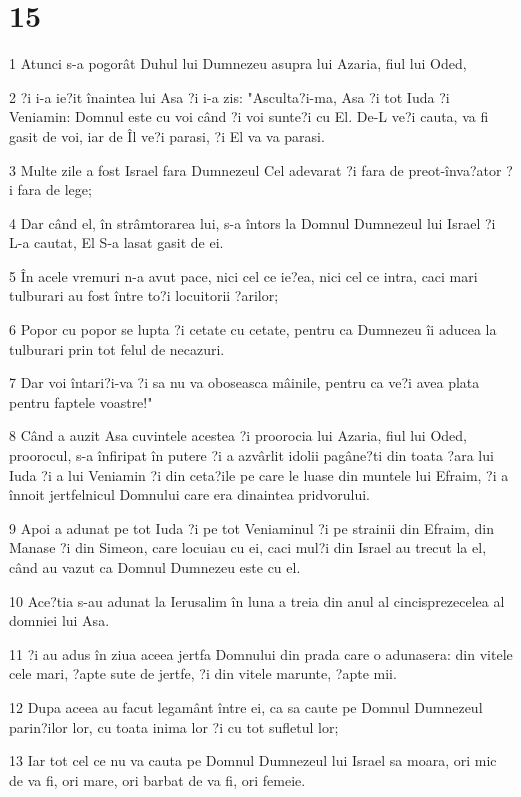 \chapter{15}

\par 1 Atunci s-a pogorât Duhul lui Dumnezeu asupra lui Azaria, fiul lui Oded,
\par 2 ?i i-a ie?it înaintea lui Asa ?i i-a zis: "Asculta?i-ma, Asa ?i tot Iuda ?i Veniamin: Domnul este cu voi când ?i voi sunte?i cu El. De-L ve?i cauta, va fi gasit de voi, iar de Îl ve?i parasi, ?i El va va parasi.
\par 3 Multe zile a fost Israel fara Dumnezeul Cel adevarat ?i fara de preot-înva?ator ?i fara de lege;
\par 4 Dar când el, în strâmtorarea lui, s-a întors la Domnul Dumnezeul lui Israel ?i L-a cautat, El S-a lasat gasit de ei.
\par 5 În acele vremuri n-a avut pace, nici cel ce ie?ea, nici cel ce intra, caci mari tulburari au fost între to?i locuitorii ?arilor;
\par 6 Popor cu popor se lupta ?i cetate cu cetate, pentru ca Dumnezeu îi aducea la tulburari prin tot felul de necazuri.
\par 7 Dar voi întari?i-va ?i sa nu va oboseasca mâinile, pentru ca ve?i avea plata pentru faptele voastre!"
\par 8 Când a auzit Asa cuvintele acestea ?i proorocia lui Azaria, fiul lui Oded, proorocul, s-a înfiripat în putere ?i a azvârlit idolii pagâne?ti din toata ?ara lui Iuda ?i a lui Veniamin ?i din ceta?ile pe care le luase din muntele lui Efraim, ?i a înnoit jertfelnicul Domnului care era dinaintea pridvorului.
\par 9 Apoi a adunat pe tot Iuda ?i pe tot Veniaminul ?i pe strainii din Efraim, din Manase ?i din Simeon, care locuiau cu ei, caci mul?i din Israel au trecut la el, când au vazut ca Domnul Dumnezeu este cu el.
\par 10 Ace?tia s-au adunat la Ierusalim în luna a treia din anul al cincisprezecelea al domniei lui Asa.
\par 11 ?i au adus în ziua aceea jertfa Domnului din prada care o adunasera: din vitele cele mari, ?apte sute de jertfe, ?i din vitele marunte, ?apte mii.
\par 12 Dupa aceea au facut legamânt între ei, ca sa caute pe Domnul Dumnezeul parin?ilor lor, cu toata inima lor ?i cu tot sufletul lor;
\par 13 Iar tot cel ce nu va cauta pe Domnul Dumnezeul lui Israel sa moara, ori mic de va fi, ori mare, ori barbat de va fi, ori femeie.
